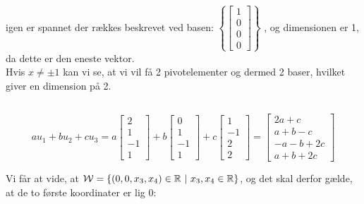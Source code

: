 \documentclass[a4paper,12pt]{article}
\begin{document}
igen er spannet der rækkes beskrevet ved basen: $\left\{ \left[\begin{array}{cc|c}
    1\\
    0\\
    0\\
    0 
\end{array}\right] \right\}$
, og dimensionen er 1, da dette er den eneste vektor.\\

Hvis $x \neq \pm 1$ kan vi se, at vi vil få 2 pivotelementer og dermed 2 baser, hvilket giver en dimension på 2.

\subsection{}

\[
au_1 + bu_2 + cu_3 = 
a
\left[\begin{array}{cc|c}
    2 \\
    1 \\
    -1 \\
    1 
\end{array}\right]
+
b
\left[\begin{array}{cc|c}
    0 \\
    1 \\
    -1 \\
    1 
\end{array}\right]
+
c
\left[\begin{array}{cc|c}
    1 \\
    -1 \\
    2 \\
    2 
\end{array}\right]
=
\left[\begin{array}{cc|c}
    2a + c \\
    a+b-c \\
    -a-b+2c \\
    a+b+2c
\end{array}\right]
\]

Vi får at vide, at $\mathcal{W} = \{(0,0,x_3,x_4)\in \mathbb{R} \ \vert \ x_3, x_4 \in \mathbb{R} \}$, og det skal derfor gælde, at de to første koordinater er lig 0:\\
\end{document}
